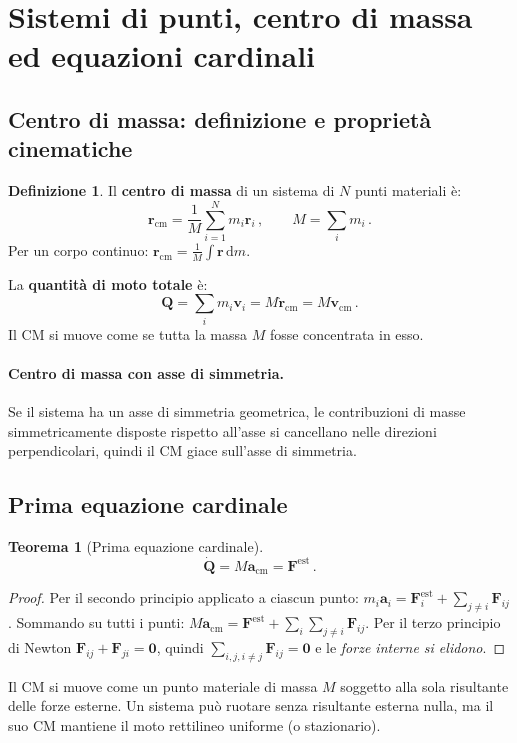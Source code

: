\documentclass[11pt,a4paper]{article}
\renewcommand{\vec}[1]{\bm{#1}}
\newcommand{\CM}{\mathrm{cm}}
\theoremstyle{plain}
\newtheorem{teorema}{Teorema}[section]
\theoremstyle{definition}
\newtheorem{definizione}{Definizione}[section]
\theoremstyle{remark}
\begin{document}
\section{Sistemi di punti, centro di massa ed equazioni cardinali}

\subsection{Centro di massa: definizione e proprietà cinematiche}

\begin{definizione}
Il \textbf{centro di massa} di un sistema di $N$ punti materiali è:
\[
  \vec{r}_\CM=\frac{1}{M}\sum_{i=1}^N m_i\vec{r}_i\,,\qquad M=\sum_i m_i\,.
\]
Per un corpo continuo: $\vec{r}_\CM=\frac{1}{M}\int\vec{r}\,\mathrm{d}m$.
\end{definizione}

La \textbf{quantità di moto totale} è:
\[
  \vec{Q}=\sum_i m_i\vec{v}_i=M\dot{\vec{r}}_\CM=M\vec{v}_\CM\,.
\]
Il CM si muove come se tutta la massa $M$ fosse concentrata in esso.

\paragraph{Centro di massa con asse di simmetria.}
Se il sistema ha un asse di simmetria geometrica, le contribuzioni di masse
simmetricamente disposte rispetto all'asse si cancellano nelle direzioni
perpendicolari, quindi il CM giace sull'asse di simmetria.

\subsection{Prima equazione cardinale}

\begin{teorema}[Prima equazione cardinale]
\[
  \dot{\vec{Q}}=M\vec{a}_\CM=\vec{F}^\mathrm{est}\,.
\]
\end{teorema}
\begin{proof}
Per il secondo principio applicato a ciascun punto:
$m_i\vec{a}_i=\vec{F}_i^\mathrm{est}+\sum_{j\neq i}\vec{F}_{ij}$.
Sommando su tutti i punti:
$M\vec{a}_\CM=\vec{F}^\mathrm{est}+\sum_{i}\sum_{j\neq i}\vec{F}_{ij}$.
Per il terzo principio di Newton $\vec{F}_{ij}+\vec{F}_{ji}=\vec{0}$, quindi
$\sum_{i,j,i\neq j}\vec{F}_{ij}=\vec{0}$ e le \emph{forze interne si elidono}.
\end{proof}
Il CM si muove come un punto materiale di massa $M$ soggetto alla sola
risultante delle forze esterne. Un sistema può ruotare senza risultante
esterna nulla, ma il suo CM mantiene il moto rettilineo uniforme (o stazionario).
\end{document}
